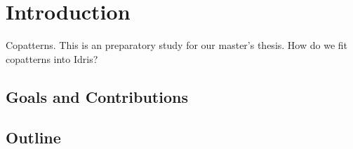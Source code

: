 \section{Introduction}
\label{sec:introduction}
Copatterns. This is an preparatory study for our master's thesis.
How do we fit copatterns into Idris?

\subsection{Goals and Contributions}

\subsection{Outline}